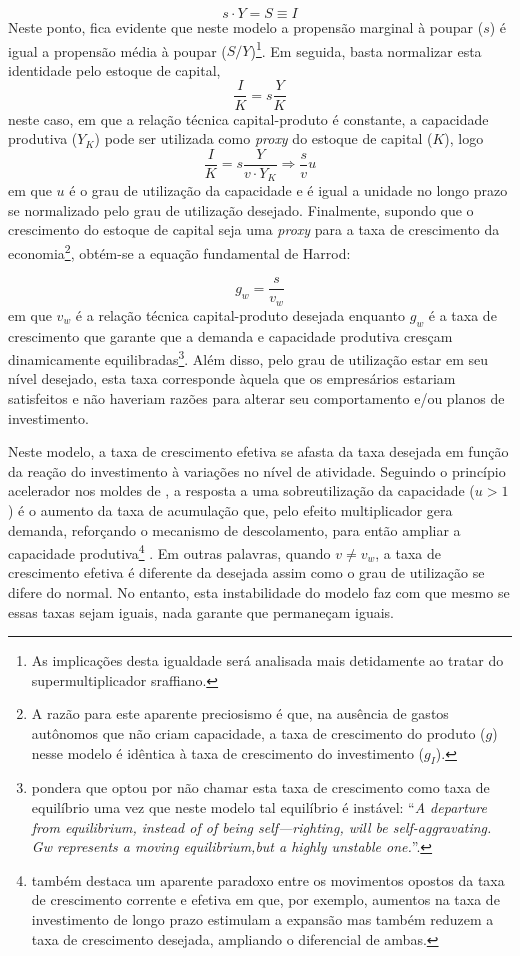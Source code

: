 $$
s\cdot Y = S \equiv I
$$
Neste ponto, fica evidente que neste modelo a propensão marginal à poupar ($s$) é igual a propensão média à poupar ($S/Y$)\footnote{ As implicações desta igualdade será analisada mais detidamente ao tratar do supermultiplicador sraffiano.}. Em seguida, basta normalizar esta identidade pelo estoque de capital,
$$
\frac{I}{K} = s\frac{Y}{K}
$$
neste caso, em que a relação técnica capital-produto é constante, a capacidade produtiva ($Y_K$) pode ser utilizada como \textit{proxy} do estoque de capital ($K$), logo
$$
\frac{I}{K} = s\frac{Y}{v\cdot Y_K} \Rightarrow \frac{s}{v}u
$$
em que $u$ é o grau de utilização da capacidade e é igual a unidade no longo prazo se normalizado pelo grau de utilização desejado. Finalmente, supondo que o crescimento do estoque de capital seja uma \textit{proxy} para a taxa de crescimento da economia\footnote{A razão para este aparente preciosismo é que, na ausência de gastos autônomos que não criam capacidade, a taxa de crescimento do produto ($g$) nesse modelo é idêntica à taxa de crescimento do investimento ($g_I$).}, obtém-se a equação fundamental de Harrod:

\begin{equation}
    \label{Fundamental}
    g_w = \frac{s}{v_w}
\end{equation}
em que $v_w$ é a relação técnica capital-produto desejada enquanto $g_w$ é a taxa de crescimento que garante que a demanda e capacidade produtiva cresçam dinamicamente equilibradas\footnote{\textcite[p,~22]{harrod_essay_1939} pondera que  optou por não chamar esta taxa de crescimento como taxa de equilíbrio uma vez que neste modelo tal equilíbrio é instável: ``\textit{A departure from equilibrium, instead of of being self—righting, will be self-aggravating. Gw represents a moving equilibrium,but a highly unstable one.}''.}. Além disso, pelo grau de utilização estar em seu nível desejado, esta taxa corresponde àquela que os empresários estariam satisfeitos e não haveriam razões para alterar seu comportamento e/ou planos de investimento. 

Neste modelo, a taxa de crescimento efetiva se afasta da taxa desejada em função da reação do investimento à variações no nível de atividade. Seguindo o princípio acelerador nos moldes de \textcite{harrod_essay_1939}, a resposta a uma sobreutilização da capacidade ($u>1$) é o aumento da taxa de acumulação que, pelo efeito multiplicador gera  demanda, reforçando o mecanismo de descolamento, para então ampliar a capacidade produtiva\footnote{\textcite{harrod_essay_1939} também destaca um aparente paradoxo entre os movimentos opostos da taxa de crescimento corrente e efetiva em que, por exemplo, aumentos na taxa de investimento de longo prazo estimulam a expansão mas também reduzem a taxa de crescimento desejada, ampliando o diferencial de ambas.} \cite[p.~12]{serrano_trouble_2017}. Em outras palavras, quando $v\neq v_w$,  a taxa de crescimento efetiva é diferente da desejada assim como o grau de utilização se difere do normal. No entanto, esta instabilidade do modelo faz com que mesmo se essas taxas sejam iguais, nada garante que permaneçam iguais.


